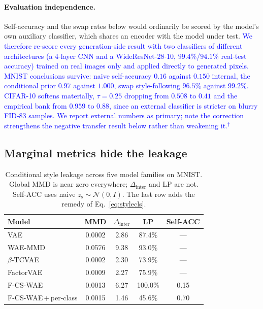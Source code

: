 \documentclass[letterpaper]{article} %
\newcommand{\pj}[1]{\textcolor{blue}{#1$^{\dagger}$}}
\newcommand{\ours}{F-CS-WAE}
\newcommand{\zs}{z_{\mathrm{s}}}
\newcommand{\Dinter}{\Delta_{\mathrm{inter}}}
\begin{document}
\paragraph{Evaluation independence.}
Self-accuracy and the swap rates below would ordinarily be scored by the
model's own auxiliary classifier, which shares an encoder with the model
under test. \pj{We therefore re-score every generation-side result with two
classifiers of different architectures (a 4-layer CNN and a WideResNet-28-10,
$99.4\%$/$94.1\%$ real-test accuracy) trained on real images only and applied
directly to generated pixels. MNIST conclusions survive: naive self-accuracy
$0.16$ against $0.150$ internal, the conditional prior $0.97$ against
$1.000$, swap style-following $96.5\%$ against $99.2\%$. CIFAR-10 softens
materially, $\tau{=}0.25$ dropping from $0.508$ to $0.41$ and the empirical
bank from $0.959$ to $0.88$, since an external classifier is stricter on
blurry FID-$83$ samples. We report external numbers as primary; note the
correction strengthens the negative transfer result below rather than
weakening it.}

\subsection{Marginal metrics hide the leakage}
\label{sec:exp-hide}

\begin{table}[t]
\centering
\small
\setlength{\tabcolsep}{4pt}
\caption{Conditional style leakage across five model families on MNIST.
Global MMD is near zero everywhere; $\Dinter$ and LP are not. Self-ACC uses
naive $\zs\sim\mathcal N(0,I)$. The last row adds the remedy of
Eq.~\ref{eq:stylecls}.}
\label{tab:cross}
\begin{tabular}{lcccc}
\toprule
Model & MMD & $\Dinter$ & LP & Self-ACC \\
\midrule
VAE           & 0.0002 & 2.86 & 87.4\% & --- \\
WAE-MMD       & 0.0576 & 9.38 & 93.0\% & --- \\
$\beta$-TCVAE & 0.0002 & 2.30 & 73.9\% & --- \\
FactorVAE     & 0.0009 & 2.27 & 75.9\% & --- \\
\ours{}       & 0.0013 & 6.27 & 100.0\% & 0.15 \\
\midrule
\ours{}\,$+$\,per-class & 0.0015 & 1.46 & 45.6\% & 0.70 \\
\bottomrule
\end{tabular}
\end{table}
\end{document}
